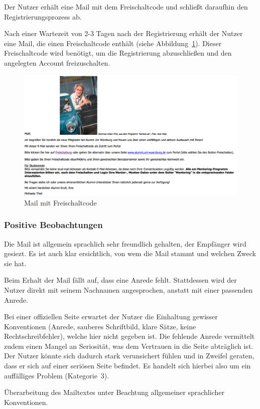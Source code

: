 \newpage
{}
\label{subsec:freischaltung}
Der Nutzer erhält eine Mail mit dem Freischaltcode und schließt daraufhin den Registrierungsprozess ab.

Nach einer Wartezeit von 2-3 Tagen nach der Registrierung erhält der Nutzer eine Mail, die einen Freischaltcode enthält (siehe Abbildung~\ref{fig:regmail}). Dieser Freischaltcode wird benötigt, um die Registrierung abzuschließen und den angelegten Account freizuschalten.

\begin{figure}
	\centering
		\includegraphics[width=\textwidth]{figures/regmail.jpg}
	\caption{Mail mit Freischaltcode}
	\label{fig:regmail}
\end{figure}

\subsubsection*{Positive Beobachtungen}
\label{subsubsec:freischaltung_mail_positiv}

Die Mail ist allgemein sprachlich sehr freundlich gehalten, der Empfänger wird gesiezt. Es ist auch klar ersichtlich, von wem die Mail stammt und welchen Zweck sie hat.

{
Beim Erhalt der Mail fällt auf, dass eine Anrede fehlt. Stattdessen wird der Nutzer direkt mit seinem Nachnamen angesprochen, anstatt mit einer passenden Anrede.
}
{
Bei einer offiziellen Seite erwartet der Nutzer die Einhaltung gewisser Konventionen (Anrede, sauberes Schriftbild, klare Sätze, keine Rechtschreibfehler), welche hier nicht gegeben ist. Die fehlende Anrede vermittelt zudem einen Mangel an Seriosität, was dem Vertrauen in die Seite abträglich ist. Der Nutzer könnte sich dadurch stark verunsichert fühlen und in Zweifel geraten, dass er sich auf einer seriösen Seite befindet. Es handelt sich hierbei also um ein auffälliges Problem (Kategorie~3).

}
{
Überarbeitung des Mailtextes unter Beachtung allgemeiner sprachlicher Konventionen.
}
\label{prob:frei:mailanrede}

